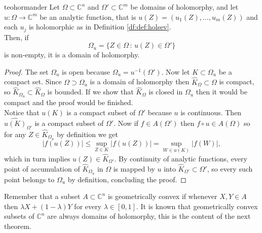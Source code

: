 \begin{mytheo}{}{teohormander}
Let $\Omega\subset \mathbb{C}^n$ and $\Omega' \subset \mathbb{C}^m$ be domains of holomorphy, and let $u:\Omega \rightarrow \mathbb{C}^m$ be an analytic function, that is $u(Z)=(u_1(Z),\dots, u_m(Z))$ and each $u_j$ is holomorphic as in Definition \ref{df:def:holsev}.\\
Then, if
$$\Omega_u = \{Z\in \Omega \,:\, u(Z)\in \Omega'\}$$
is non-empty, it is a domain of holomorphy.
\end{mytheo}

\begin{proof}
The set $\Omega_u$ is open because $\Omega_u = u^{-1}(\Omega')$. Now let $K \subset \Omega_u$ be a compact set. Since $\Omega\supset \Omega_u$ is a domain of holomorphy then $\widehat{K}_{\Omega} \subset \Omega$ is compact, so $\widehat{K}_{\Omega_u} \subset \widehat{K}_\Omega$ is bounded. If we show that $\widehat{K}_\Omega$ is closed in $\Omega_u$ then it would be compact and the proof would be finished.\\

Notice that $u(K)$ is a compact subset of $\Omega'$ because $u$ is continuous. Then $\widehat{u(K)}_{\Omega'}$ is a compact subset of $\Omega'$. Now if $f\in A(\Omega')$ then $f\circ u\in A(\Omega)$ so for any $Z\in \widehat{K}_{\Omega_u}$ by definition we get
$$|f(u(Z))| \leq \sup_{Z\in K} |f(u(Z))| = \sup_{W\in u(K)} |f(W)|,$$
which in turn implies $u(Z)\in \widehat{K}_{\Omega'}$. By continuity of analytic functions, every point of accumulation of $\widehat{K}_{\Omega_u}$ in $\Omega$ is mapped by $u$ into $\widehat{K}_{\Omega'}\subset \Omega'$, so every such point belongs to $\Omega_u$ by definition, concluding the proof.
\end{proof}

Remember that a subset $A\subset \mathbb{C}^n$ is geometrically convex if whenever $X,Y\in A$ then $\lambda X + (1-\lambda)Y$ for every $\lambda\in[0,1]$. It is known that geometrically convex subsets of $\mathbb{C}^n$ are always domains of holomorphy, this is the content of the next theorem.\\

